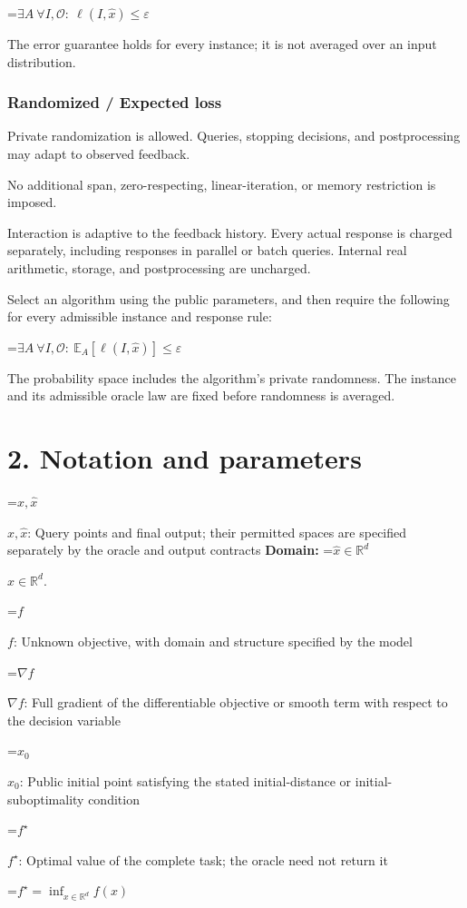 \documentclass[10pt,a4paper]{article}
\newcommand{\AtlasMath}[1]{\par\begingroup\centering\setbox0=\hbox{$\displaystyle #1$}\ifdim\wd0>1.4\linewidth\typeout{ATLAS WIDE FORMULA: \the\wd0}\fi\ifdim\wd0>\linewidth\resizebox{\linewidth}{!}{\box0}\else\box0\fi\par\endgroup}
\newcommand{\AtlasInlineMath}[1]{\begingroup\setbox0=\hbox{$#1$}\ifdim\wd0>.4\linewidth\endgroup\AtlasMath{#1}\else\endgroup$#1$\fi}
\begin{document}
\AtlasMath{\exists A\ \forall I,\mathcal{O}:\ \ell(I,\widehat{x})\le\varepsilon}


The error guarantee holds for every instance; it is not averaged over an input distribution.

\subsubsection{Randomized / Expected loss}
Private randomization is allowed. Queries, stopping decisions, and postprocessing may adapt to observed feedback.

No additional span, zero-respecting, linear-iteration, or memory restriction is imposed.

Interaction is adaptive to the feedback history. Every actual response is charged separately, including responses in parallel or batch queries. Internal real arithmetic, storage, and postprocessing are uncharged.

Select an algorithm using the public parameters, and then require the following for every admissible instance and response rule:


\AtlasMath{\exists A\ \forall I,\mathcal{O}:\ \mathbb{E}_A[\ell(I,\widehat{x})]\le\varepsilon}


The probability space includes the algorithm's private randomness. The instance and its admissible oracle law are fixed before randomness is averaged.

\section{2. Notation and parameters}
\AtlasInlineMath{x,\widehat{x}}: Query points and final output; their permitted spaces are specified separately by the oracle and output contracts \textbf{Domain:} \AtlasInlineMath{\widehat{x}\in \mathbb{R}^d}.

\AtlasInlineMath{f}: Unknown objective, with domain and structure specified by the model

\AtlasInlineMath{\nabla f}: Full gradient of the differentiable objective or smooth term with respect to the decision variable

\AtlasInlineMath{x_0}: Public initial point satisfying the stated initial-distance or initial-suboptimality condition

\AtlasInlineMath{f^\star}: Optimal value of the complete task; the oracle need not return it


\AtlasMath{f^\star=\inf_{x\in \mathbb{R}^d}f(x)}
\end{document}
